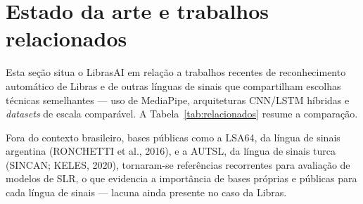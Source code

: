 \section{Estado da arte e trabalhos relacionados}

Esta seção situa o LibrasAI em relação a trabalhos recentes de reconhecimento
automático de Libras e de outras línguas de sinais que compartilham escolhas
técnicas semelhantes — uso de MediaPipe, arquiteturas CNN/LSTM híbridas e
\textit{datasets} de escala comparável. A Tabela~\ref{tab:relacionados} resume a
comparação.

Fora do contexto brasileiro, bases públicas como a LSA64, da língua de sinais
argentina (RONCHETTI et al., 2016), e a AUTSL, da língua de sinais turca (SINCAN;
KELES, 2020), tornaram-se referências recorrentes para avaliação de modelos de
SLR, o que evidencia a importância de bases próprias e públicas para cada língua
de sinais — lacuna ainda presente no caso da Libras.

